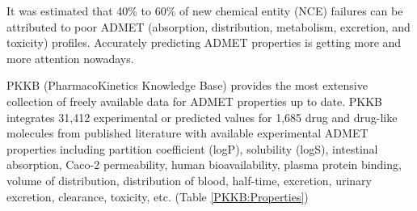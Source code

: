 
It was estimated that 40\% to 60\% of new chemical entity (NCE) failures can be attributed to poor ADMET (absorption, distribution, metabolism, excretion, and toxicity) profiles. Accurately predicting ADMET properties is getting more and more attention nowadays.

PKKB (PharmacoKinetics Knowledge Base) \citep{1133} provides the most extensive collection of freely available data for ADMET properties up to date. PKKB integrates 31,412 experimental or predicted values for 1,685 drug and drug-like molecules from published literature with available experimental ADMET properties including partition coefficient (logP), solubility (logS), intestinal absorption, Caco-2 permeability, human bioavailability, plasma protein binding, volume of distribution, distribution of blood, half-time, excretion, urinary excretion, clearance, toxicity, etc. (Table \ref{PKKB:Properties})

